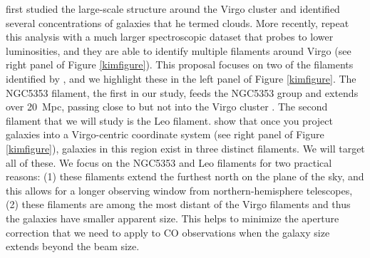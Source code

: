 \documentclass[11pt, preprint]{aastex}
\newcommand{\ha}{H$\alpha$}
\begin{document}
 



\citet{tully82} first studied the large-scale structure around the Virgo
cluster and identified several concentrations of galaxies that he
termed clouds.  More recently, \citet{kim16} repeat this analysis with
a much larger spectroscopic dataset that probes to lower luminosities,
and they are able to identify multiple
filaments around Virgo (see right panel of Figure \ref{kimfigure}).
This proposal focuses on two of the filaments identified by
\citet{kim16}, and we highlight these in the left panel of Figure
\ref{kimfigure}.  The NGC5353 filament, the first in our study, feeds the NGC5353 group and extends over 20~Mpc,
passing close to but not into the Virgo cluster \citep{kim16}.  The second filament
that we will study is the Leo filament.  \citet{kim16} show that once
you project galaxies into a Virgo-centric coordinate system (see right
panel of Figure \ref{kimfigure}), galaxies
in this region exist in three distinct filaments.  We will target all
of these.  We focus on
the NGC5353 and Leo filaments for two practical reasons:  (1) these filaments
extend the furthest north on the plane of the sky, and this allows
for a longer observing window from northern-hemisphere telescopes, (2)
these filaments are among the most distant of the Virgo filaments and
thus the galaxies have smaller apparent size.  This helps to minimize
the aperture correction that we need to apply to CO observations when the galaxy size extends beyond the beam size.  
\end{document}
